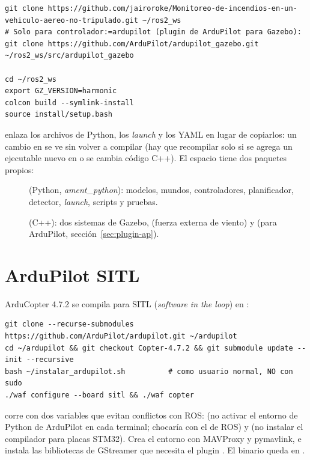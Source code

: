\begin{lstlisting}[style=bash]
git clone https://github.com/jairoroke/Monitoreo-de-incendios-en-un-vehiculo-aereo-no-tripulado.git ~/ros2_ws
# Solo para controlador:=ardupilot (plugin de ArduPilot para Gazebo):
git clone https://github.com/ArduPilot/ardupilot_gazebo.git ~/ros2_ws/src/ardupilot_gazebo

cd ~/ros2_ws
export GZ_VERSION=harmonic
colcon build --symlink-install
source install/setup.bash
\end{lstlisting}

 enlaza los archivos de Python, los \emph{launch} y los YAML en lugar de
copiarlos: un cambio en  se ve sin volver a compilar (hay que recompilar solo si se
agrega un ejecutable nuevo en  o se cambia código C++). El espacio tiene dos
paquetes propios:

\begin{description}
  \item[] (Python, \emph{ament\_python}): modelos, mundos, controladores,
        planificador, detector, \emph{launch}, scripts y pruebas.
  \item[] (C++): dos sistemas de Gazebo,  (fuerza
        externa de viento) y  (para ArduPilot, sección~\ref{sec:plugin-ap}).
\end{description}

\section{ArduPilot SITL}
\label{sec:inst-ardupilot}

ArduCopter 4.7.2 se compila para SITL (\emph{software in the loop}) en :

\begin{lstlisting}[style=bash]
git clone --recurse-submodules https://github.com/ArduPilot/ardupilot.git ~/ardupilot
cd ~/ardupilot && git checkout Copter-4.7.2 && git submodule update --init --recursive
bash ~/instalar_ardupilot.sh          # como usuario normal, NO con sudo
./waf configure --board sitl && ./waf copter
\end{lstlisting}

 corre 
con dos variables que evitan conflictos con ROS:
 (no activar el entorno de Python de ArduPilot en cada terminal; chocaría
con el  de ROS) y  (no instalar el compilador para placas STM32).
Crea el entorno  con MAVProxy y pymavlink, e instala las bibliotecas de
GStreamer que necesita el plugin . El binario queda en
.

